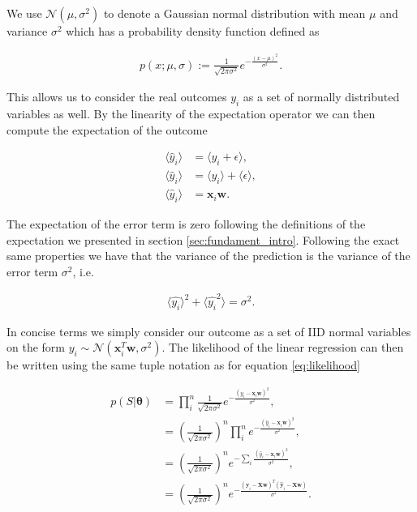 \noindent We use $\mathcal{N}(\mu, \sigma^2)$ to denote a Gaussian normal distribution with mean $\mu$ and variance $\sigma^2$ which has a probability density function defined as 

\begin{align}
p(x ; \mu, \sigma) := \frac{1}{\sqrt{2\pi \sigma^2}}e^{-\frac{(x - \mu)^2}{\sigma^2}}.
\end{align}

\noindent This allows us to consider the real outcomes $y_i$ as a set of normally distributed variables as well. By the linearity of the expectation operator we can then compute the expectation of the outcome 

\begin{align}
\langle \hat{y}_i \rangle &= \langle y_i + \epsilon \rangle,  \\
\langle \hat{y}_i\rangle &= \langle y_i \rangle + \langle \epsilon \rangle, \\
\langle \hat{y}_i \rangle &= \boldsymbol{x}_i\boldsymbol{w}.
\end{align}

\noindent The expectation of the error term is zero following the definitions of the expectation we presented in section \ref{sec:fundament_intro}. Following the exact same properties we have that the variance of the prediction is the variance of the error term $\sigma^2$, i.e. 

\begin{align}
\langle \hat{y_i}\rangle^2 + \langle \hat{y_i}^2\rangle = \sigma^2.
\end{align}

\noindent In concise terms we simply consider our outcome as a set of IID normal variables on the form $y_i \sim \mathcal{N}(\boldsymbol{x}_i^T\boldsymbol{w}, \sigma^2)$. The likelihood of the linear regression can then be written using the same tuple notation as for equation \ref{eq:likelihood}

\begin{align}
p(S|\boldsymbol{\theta}) 
&= \prod_i^n \frac{1}{\sqrt{2\pi \sigma^2}}e^{-\frac{(\hat{y}_i - \boldsymbol{x}_i\boldsymbol{w})^2}{\sigma^2}}, \\
&= \left(\frac{1}{\sqrt{2\pi \sigma^2}} \right)^n \prod_i^n e^{-\frac{(\hat{y}_i - \boldsymbol{x}_i\boldsymbol{w})^2}{\sigma^2}}, \\
&= \left(\frac{1}{\sqrt{2\pi \sigma^2}} \right)^n  e^{-\sum_i\frac{(\hat{y}_i - \boldsymbol{x}_i\boldsymbol{w})^2}{\sigma^2}}, \\
&= \left(\frac{1}{\sqrt{2\pi \sigma^2}} \right)^n  e^{-\frac{(\boldsymbol{\hat{y}}_i - \boldsymbol{X}\boldsymbol{w})^T(\boldsymbol{\hat{y}}_i - \boldsymbol{X}\boldsymbol{w})}{\sigma^2}} .
\end{align}


